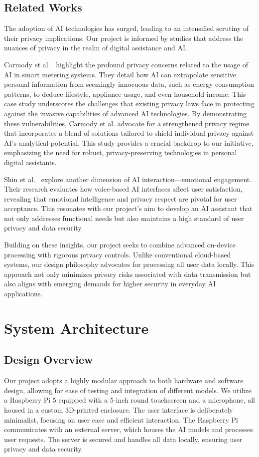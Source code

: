 \documentclass[12pt]{article}
\begin{document}
\subsection{Related Works}
The adoption of AI technologies has surged, leading to an intensified scrutiny of their privacy implications. Our project is informed by studies that address the nuances of privacy in the realm of digital assistance and AI.

Carmody et al.~\cite{carmody2021privacy} highlight the profound privacy concerns related to the usage of AI in smart metering systems. They detail how AI can extrapolate sensitive personal information from seemingly innocuous data, such as energy consumption patterns, to deduce lifestyle, appliance usage, and even household income. This case study underscores the challenges that existing privacy laws face in protecting against the invasive capabilities of advanced AI technologies. By demonstrating these vulnerabilities, Carmody et al. advocate for a strengthened privacy regime that incorporates a blend of solutions tailored to shield individual privacy against AI's analytical potential. This study provides a crucial backdrop to our initiative, emphasizing the need for robust, privacy-preserving technologies in personal digital assistants.

Shin et al.~\cite{shin2021emotional} explore another dimension of AI interaction—emotional engagement. Their research evaluates how voice-based AI interfaces affect user satisfaction, revealing that emotional intelligence and privacy respect are pivotal for user acceptance. This resonates with our project’s aim to develop an AI assistant that not only addresses functional needs but also maintains a high standard of user privacy and data security.

Building on these insights, our project seeks to combine advanced on-device processing with rigorous privacy controls. Unlike conventional cloud-based systems, our design philosophy advocates for processing all user data locally. This approach not only minimizes privacy risks associated with data transmission but also aligns with emerging demands for higher security in everyday AI applications.


\section{System Architecture}
\subsection{Design Overview}
Our project adopts a highly modular approach to both hardware and software design, allowing for ease of testing and integration of different models. 
We utilize a Raspberry Pi 5 equipped with a 5-inch round touchscreen and a microphone, all housed in a custom 3D-printed enclosure. The user interface is deliberately minimalist, focusing on user ease and efficient interaction.
The Raspberry Pi communicates with an external server, which houses the AI models and processes user requests. The server is secured and handles all data locally, ensuring user privacy and data security.
\end{document}
